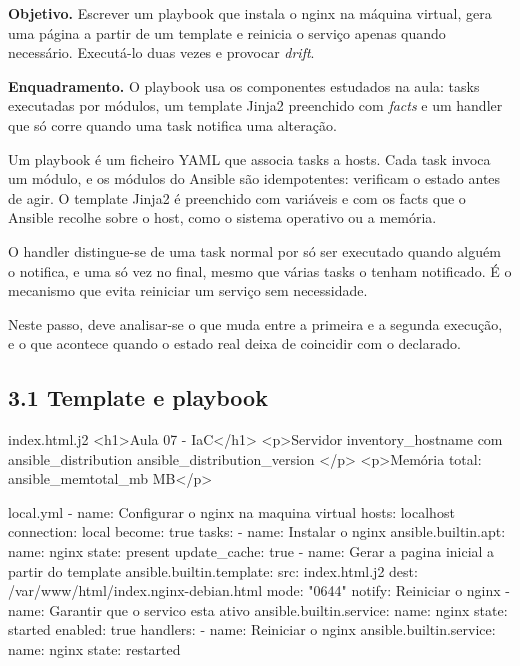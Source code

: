 \documentclass[11pt,a4paper]{article}
\begin{document}
\textbf{Objetivo.} Escrever um playbook que instala o nginx na máquina virtual, gera uma página a partir de um template e reinicia o serviço apenas quando necessário. Executá-lo duas vezes e provocar \emph{drift}.

\textbf{Enquadramento.} O playbook usa os componentes estudados na aula: tasks executadas por módulos, um template Jinja2 preenchido com \emph{facts} e um handler que só corre quando uma task notifica uma alteração.

\begin{teoria}
Um playbook é um ficheiro YAML que associa tasks a hosts. Cada task invoca um módulo, e os módulos do Ansible são idempotentes: verificam o estado antes de agir. O template Jinja2 é preenchido com variáveis e com os facts que o Ansible recolhe sobre o host, como o sistema operativo ou a memória.

O handler distingue-se de uma task normal por só ser executado quando alguém o notifica, e uma só vez no final, mesmo que várias tasks o tenham notificado. É o mecanismo que evita reiniciar um serviço sem necessidade.

Neste passo, deve analisar-se o que muda entre a primeira e a segunda execução, e o que acontece quando o estado real deixa de coincidir com o declarado.
\end{teoria}

\subsection*{3.1 Template e playbook}

\begin{ficheiro}{index.html.j2}
<h1>Aula 07 - IaC</h1>
<p>Servidor {{ inventory_hostname }} com {{ ansible_distribution }} {{ ansible_distribution_version }}</p>
<p>Memória total: {{ ansible_memtotal_mb }} MB</p>
\end{ficheiro}

\begin{ficheiro}{local.yml}
- name: Configurar o nginx na maquina virtual
  hosts: localhost
  connection: local
  become: true
  tasks:
    - name: Instalar o nginx
      ansible.builtin.apt:
        name: nginx
        state: present
        update_cache: true
    - name: Gerar a pagina inicial a partir do template
      ansible.builtin.template:
        src: index.html.j2
        dest: /var/www/html/index.nginx-debian.html
        mode: "0644"
      notify: Reiniciar o nginx
    - name: Garantir que o servico esta ativo
      ansible.builtin.service:
        name: nginx
        state: started
        enabled: true
  handlers:
    - name: Reiniciar o nginx
      ansible.builtin.service:
        name: nginx
        state: restarted
\end{ficheiro}
\end{document}
